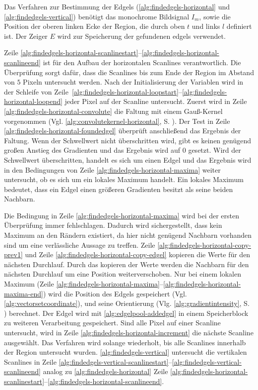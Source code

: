 Das Verfahren zur Bestimmung der Edgels (\autoref{alg:findedgels-horizontal} und \autoref{alg:findedgels-vertical})
 benötigt das monochrome Bildsignal $I_m$, sowie die Position der oberen linken Ecke der Region, die durch oben $t$ und
 links $l$ definiert ist. Der Zeiger $E$ wird zur Speicherung der gefundenen \glspl{edgel} verwendet.



Zeile \ref{alg:findedgels-horizontal-scanlinestart}--\ref{alg:findedgels-horizontal-scanlineend} ist für den Aufbau der
 horizontalen Scanlines verantwortlich. Die Überprüfung sorgt dafür, dass die Scanlines bis zum Ende der Region im
 Abstand von $5$ Pixeln untersucht werden. Nach der Initialisierung der Variablen wird in der Schleife von
 Zeile~\ref{alg:findedgels-horizontal-loopstart}--\ref{alg:findedgels-horizontal-loopend} jeder Pixel auf der Scanline
 untersucht. Zuerst wird in Zeile \ref{alg:findedgels-horizontal-convolute} die Faltung mit einem Gauß-Kernel
 vorgenommen (Vgl. \autoref{alg:convolutekernel-horizontal}, S. \pageref{alg:convolutekernel-horizontal}). Der Test
 in Zeile \ref{alg:findedgels-horizontal-foundedgel} überprüft anschließend das Ergebnis der Faltung. Wenn der
 Schwellwert nicht überschritten wird, gibt es keinen genügend großen Anstieg des Gradienten und das Ergebnis wird auf
 $0$ gesetzt. Wird der Schwellwert überschritten, handelt es sich um einen Edgel und das Ergebnis wird in den
 Bedingungen von Zeile \ref{alg:findedgels-horizontal-maxima} weiter untersucht, ob es sich um ein lokales Maximum
 handelt. Ein lokales Maximum bedeutet, dass ein Edgel einen größeren Gradienten besitzt als seine beiden Nachbarn.

Die Bedingung in Zeile \ref{alg:findedgels-horizontal-maxima} wird bei der ersten Überprüfung immer fehlschlagen.
 Dadurch wird sichergestellt, dass kein Maximum an den Rändern existiert, da hier nicht genügend Nachbarn vorhanden sind
 um eine verlässliche Aussage zu treffen. Zeile \ref{alg:findedgels-horizontal-copy-prev1} und
 Zeile \ref{alg:findedgels-horizontal-copy-edgel} kopieren die Werte für den nächsten Durchlauf. Durch das kopieren der
 Werte werden die Nachbarn für den nächsten Durchlauf um eine Position weiterverschoben. Nur bei einem lokalen Maximum
 (Zeile \ref{alg:findedgels-horizontal-maxima}--\ref{alg:findedgels-horizontal-maxima-end}) wird die Position des
 Edgels gespeichert (Vgl. \autoref{alg:vectorsetcoordinate}), und seine Orientierung
 (Vlg. \autoref{alg:gradientintensity}, S. \pageref{alg:gradientintensity}) berechnet. Der Edgel wird mit
 \autoref{alg:edgelpool-addedgel} in einem Speicherblock zu weiteren Verarbeitung gespeichert. Sind alle Pixel auf
 einer Scanline untersucht, wird in Zeile \ref{alg:findedgels-horizontal-increment} die nächste Scanline ausgewählt.
 Das Verfahren wird solange wiederholt, bis alle Scanlines innerhalb der Region untersucht wurden.
 \autoref{alg:findedgels-vertical} untersucht die vertikalen Scanlines in Zeile
 \ref{alg:findedgels-vertical-scanlinestart}--\ref{alg:findedgels-vertical-scanlineend} analog zu
 \autoref{alg:findedgels-horizontal} Zeile
 \ref{alg:findedgels-horizontal-scanlinestart}--\ref{alg:findedgels-horizontal-scanlineend}.

